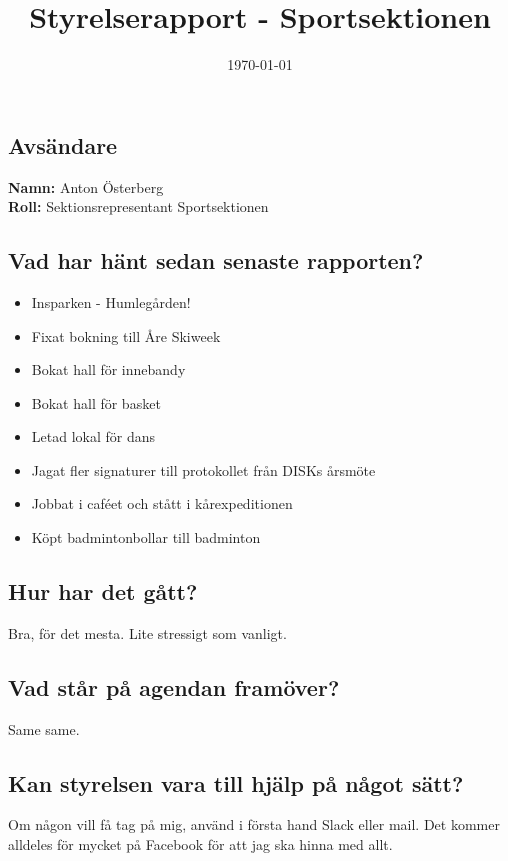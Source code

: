 \documentclass[a4paper]{article}
\begin{document}
	\title{Styrelserapport - Sportsektionen}
	\date{\today}
	\maketitle

	\subsection{Avsändare}
		\textbf{Namn:} Anton Österberg\\
		\textbf{Roll:} Sektionsrepresentant Sportsektionen\\
	\subsection{Vad har hänt sedan senaste rapporten?}
	\begin{itemize}
		\item Insparken - Humlegården!
		\item Fixat bokning till Åre Skiweek
		\item Bokat hall för innebandy
		\item Bokat hall för basket
		\item Letad lokal för dans
		\item Jagat fler signaturer till protokollet från DISKs årsmöte
		\item Jobbat i caféet och stått i kårexpeditionen
		\item Köpt badmintonbollar till badminton
	\end{itemize}
	\subsection{Hur har det gått?}
	Bra, för det mesta. Lite stressigt som vanligt.
	\subsection{Vad står på agendan framöver?}
	Same same.
	\subsection{Kan styrelsen vara till hjälp på något sätt?}
	Om någon vill få tag på mig, använd i första hand Slack eller mail. Det kommer alldeles för mycket på Facebook för att jag ska hinna med allt.
\end{document}
